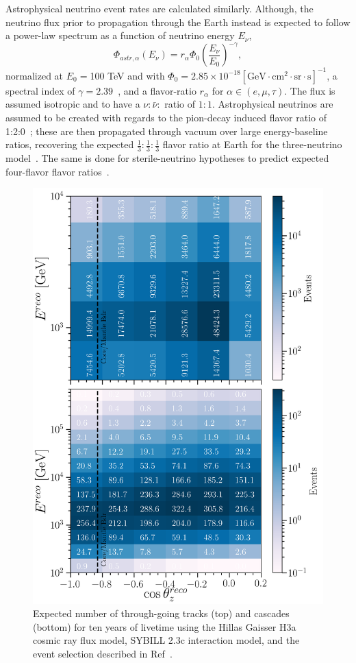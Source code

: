 \documentclass[main.tex]{subfiles}
\begin{document}
Astrophysical neutrino event rates are calculated similarly. Although, the neutrino flux prior to propagation through the Earth instead is expected to follow a power-law spectrum as a function of neutrino energy $E_{\nu}$, 
\begin{equation}
\Phi_{astr,\alpha}(E_{\nu}) = r_{\alpha}\Phi_{0}\left(\dfrac{E_{\nu}}{E_{0}}\right)^{-\gamma},
\end{equation}
normalized at $E_{0}=$100 TeV and with $\Phi_{0}=2.85\times 10^{-18}[\text{GeV}\cdot\text{cm}^{2}\cdot\text{sr}\cdot\text{s}]^{-1}$, a spectral index of $\gamma=2.39$~\cite{Aartsen_2020_prd}, and a flavor-ratio $r_{\alpha}$ for $\alpha\in( e,\mu,\tau)$. The flux is assumed isotropic and to have a $\nu:\bar{\nu}:$ ratio of $1:1$. 
Astrophysical neutrinos are assumed to be created with regards to the pion-decay induced flavor ratio of 1:2:0~\cite{PhysRevD.68.093005,ATHAR_2006}; these are then propagated through vacuum over large energy-baseline ratios, recovering the expected $\tfrac{1}{3}:\tfrac{1}{3}:\tfrac{1}{3}$ flavor ratio at Earth for the three-neutrino model~\cite{Aartsen_2015}.  
The same is done for sterile-neutrino hypotheses to predict expected four-flavor flavor ratios~\cite{carlos2020}. 


\begin{figure}
    \centering
    \includegraphics[width=0.8\linewidth]{figures/event_rate.png}
    \caption{Expected number of through-going tracks (top) and cascades (bottom) for ten years of livetime using the Hillas Gaisser H3a cosmic ray flux model, SYBILL 2.3c interaction model, and the event selection described in Ref~\cite{2018PhDT17N}.}\label{fig:eventrate}
\end{figure}
\end{document}
